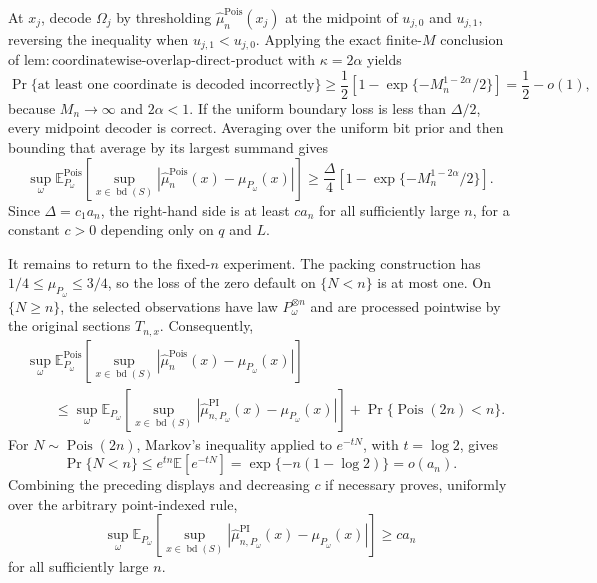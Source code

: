 At \(x_j\), decode \(\Omega_j\) by thresholding \(\widehat\mu_n^{\mathrm{Pois}}(x_j)\) at the midpoint of \(u_{j,0}\) and \(u_{j,1}\), reversing the inequality when \(u_{j,1}<u_{j,0}\).  Applying the exact finite-\(M\) conclusion of \(\mathrm{lem:coordinatewise\text{-}overlap\text{-}direct\text{-}product}\) with \(\kappa=2\alpha\) yields
\[
 \Pr\{\text{at least one coordinate is decoded incorrectly}\}
 \geq\frac12\left[1-\exp\{-M_n^{1-2\alpha}/2\}\right]
 =\frac12-o(1),
\]
because \(M_n\to\infty\) and \(2\alpha<1\).  If the uniform boundary loss is less than \(\Delta/2\), every midpoint decoder is correct.  Averaging over the uniform bit prior and then bounding that average by its largest summand gives
\[
 \sup_\omega
 \mathbb E_{P_\omega}^{\mathrm{Pois}}\!\left[
 \sup_{x\in\operatorname{bd}(S)}
 \left|\widehat\mu_n^{\mathrm{Pois}}(x)-\mu_{P_\omega}(x)\right|
 \right]
 \geq\frac{\Delta}{4}
 \left[1-\exp\{-M_n^{1-2\alpha}/2\}\right].
\]
Since \(\Delta=c_1a_n\), the right-hand side is at least \(c a_n\) for all sufficiently large \(n\), for a constant \(c>0\) depending only on \(q\) and \(L\).

It remains to return to the fixed-\(n\) experiment.  The packing construction has \(1/4\leq\mu_{P_\omega}\leq3/4\), so the loss of the zero default on \(\{N<n\}\) is at most one.  On \(\{N\geq n\}\), the selected observations have law \(P_\omega^{\otimes n}\) and are processed pointwise by the original sections \(T_{n,x}\).  Consequently,
\[
\begin{aligned}
 &\sup_\omega
 \mathbb E_{P_\omega}^{\mathrm{Pois}}\!\left[
 \sup_{x\in\operatorname{bd}(S)}
 \left|\widehat\mu_n^{\mathrm{Pois}}(x)-\mu_{P_\omega}(x)\right|
 \right]\\
 &\qquad\leq
 \sup_\omega
 \mathbb E_{P_\omega}\!\left[
 \sup_{x\in\operatorname{bd}(S)}
 \left|\widehat\mu_{n,P_\omega}^{\mathrm{PI}}(x)-\mu_{P_\omega}(x)\right|
 \right]
 +\Pr\{\operatorname{Pois}(2n)<n\}.
\end{aligned}
\]
For \(N\sim\operatorname{Pois}(2n)\), Markov's inequality applied to \(e^{-tN}\), with \(t=\log2\), gives
\[
 \Pr\{N<n\}
 \leq e^{tn}\mathbb E[e^{-tN}]
 =\exp\{-n(1-\log2)\}
 =o(a_n).
\]
Combining the preceding displays and decreasing \(c\) if necessary proves, uniformly over the arbitrary point-indexed rule,
\[
 \sup_\omega
 \mathbb E_{P_\omega}\!\left[
 \sup_{x\in\operatorname{bd}(S)}
 \left|\widehat\mu_{n,P_\omega}^{\mathrm{PI}}(x)-\mu_{P_\omega}(x)\right|
 \right]
 \geq c a_n
\]
for all sufficiently large \(n\).

